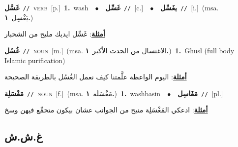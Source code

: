 \documentclass[10pt,a4paper,twoside]{article} %
\begin{document}
\begin{multicols}{2}
{\setlength\topsep{0pt}\textbf{\foreignlanguage{arabic}{غَسَّل}}\ {\color{gray}\texttt{//}\color{black}}\ \textsc{verb}\ [p.]\ \textbf{1.}~wash\ \ $\bullet$\ \ \setlength\topsep{0pt}\textbf{\foreignlanguage{arabic}{غَسِّل}}\ {\color{gray}\texttt{//}\color{black}}\ [c.]\ \ $\bullet$\ \ \setlength\topsep{0pt}\textbf{\foreignlanguage{arabic}{يغَسِّل}}\ {\color{gray}\texttt{//}\color{black}}\ [i.]\ \color{gray}(msa. \foreignlanguage{arabic}{يَغْسِل}~\foreignlanguage{arabic}{\textbf{١.}})\color{black}\  \begin{flushright}\color{gray}\foreignlanguage{arabic}{\textbf{\underline{\foreignlanguage{arabic}{أمثلة}}}: غَسِّل ايديك مليح من الشحبار}\end{flushright}\color{black}} \vspace{2mm}

{\setlength\topsep{0pt}\textbf{\foreignlanguage{arabic}{غُسُل}}\ {\color{gray}\texttt{//}\color{black}}\ \textsc{noun}\ [m.]\ \color{gray}(msa. \foreignlanguage{arabic}{الاغتسال من الحدث الأكبر}~\foreignlanguage{arabic}{\textbf{١.}})\color{black}\ \textbf{1.}~Ghusl (full body Islamic purification)\  \begin{flushright}\color{gray}\foreignlanguage{arabic}{\textbf{\underline{\foreignlanguage{arabic}{أمثلة}}}: اليوم الواعظة علَّمتنا كيف نعمل الغُسُل بالطريقة الصحيحة}\end{flushright}\color{black}} \vspace{2mm}

{\setlength\topsep{0pt}\textbf{\foreignlanguage{arabic}{مَغْسَلِة}}\ {\color{gray}\texttt{//}\color{black}}\ \textsc{noun}\ [f.]\ \color{gray}(msa. \foreignlanguage{arabic}{مَغْسَلَة}~\foreignlanguage{arabic}{\textbf{١.}})\color{black}\ \textbf{1.}~washbasin\ \ $\bullet$\ \ \setlength\topsep{0pt}\textbf{\foreignlanguage{arabic}{مَغَاسِل}}\ {\color{gray}\texttt{//}\color{black}}\ [pl.]\  \begin{flushright}\color{gray}\foreignlanguage{arabic}{\textbf{\underline{\foreignlanguage{arabic}{أمثلة}}}: ادعكي المَغْسَلِة منيح من الجوانب عشان بيكون متجمِّع فيهن وسخ}\end{flushright}\color{black}} \vspace{2mm}

\vspace{-3mm}
\subsection*{\color{blue}\foreignlanguage{arabic}{غ.ش.ش}\color{blue}{}} 


\end{multicols}
\end{document}
